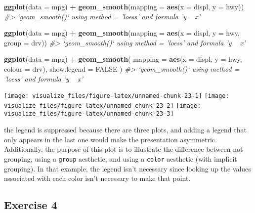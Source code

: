 \documentclass[]{book}
\newenvironment{Shaded}{\begin{snugshade}}{\end{snugshade}}
\newcommand{\CommentTok}[1]{\textcolor[rgb]{0.56,0.35,0.01}{\textit{#1}}}
\newcommand{\DataTypeTok}[1]{\textcolor[rgb]{0.13,0.29,0.53}{#1}}
\newcommand{\KeywordTok}[1]{\textcolor[rgb]{0.13,0.29,0.53}{\textbf{#1}}}
\newcommand{\NormalTok}[1]{#1}
\newcommand{\OperatorTok}[1]{\textcolor[rgb]{0.81,0.36,0.00}{\textbf{#1}}}
\newcommand{\OtherTok}[1]{\textcolor[rgb]{0.56,0.35,0.01}{#1}}
\newcommand{\StringTok}[1]{\textcolor[rgb]{0.31,0.60,0.02}{#1}}
\theoremstyle{plain}
\theoremstyle{remark}
\theoremstyle{definition}
\theoremstyle{definition}
\theoremstyle{definition}
\theoremstyle{remark}
\begin{document}
\begin{Shaded}
\begin{Highlighting}[]
\KeywordTok{ggplot}\NormalTok{(}\DataTypeTok{data =}\NormalTok{ mpg) }\OperatorTok{+}
\StringTok{  }\KeywordTok{geom_smooth}\NormalTok{(}\DataTypeTok{mapping =} \KeywordTok{aes}\NormalTok{(}\DataTypeTok{x =}\NormalTok{ displ, }\DataTypeTok{y =}\NormalTok{ hwy))}
\CommentTok{#> `geom_smooth()` using method = 'loess' and formula 'y ~ x'}

\KeywordTok{ggplot}\NormalTok{(}\DataTypeTok{data =}\NormalTok{ mpg) }\OperatorTok{+}
\StringTok{  }\KeywordTok{geom_smooth}\NormalTok{(}\DataTypeTok{mapping =} \KeywordTok{aes}\NormalTok{(}\DataTypeTok{x =}\NormalTok{ displ, }\DataTypeTok{y =}\NormalTok{ hwy, }\DataTypeTok{group =}\NormalTok{ drv))}
\CommentTok{#> `geom_smooth()` using method = 'loess' and formula 'y ~ x'}

\KeywordTok{ggplot}\NormalTok{(}\DataTypeTok{data =}\NormalTok{ mpg) }\OperatorTok{+}
\StringTok{  }\KeywordTok{geom_smooth}\NormalTok{(}
    \DataTypeTok{mapping =} \KeywordTok{aes}\NormalTok{(}\DataTypeTok{x =}\NormalTok{ displ, }\DataTypeTok{y =}\NormalTok{ hwy, }\DataTypeTok{colour =}\NormalTok{ drv),}
    \DataTypeTok{show.legend =} \OtherTok{FALSE}
\NormalTok{  )}
\CommentTok{#> `geom_smooth()` using method = 'loess' and formula 'y ~ x'}
\end{Highlighting}
\end{Shaded}

\begin{center}\texttt{[image: visualize\_files/figure-latex/unnamed-chunk-23-1]} \texttt{[image: visualize\_files/figure-latex/unnamed-chunk-23-2]} \texttt{[image: visualize\_files/figure-latex/unnamed-chunk-23-3]} \end{center}

the legend is suppressed because there are three plots, and adding a
legend that only appears in the last one would make the presentation
asymmetric. Additionally, the purpose of this plot is to illustrate the
difference between not grouping, using a \texttt{group} aesthetic, and
using a \texttt{color} aesthetic (with implicit grouping). In that
example, the legend isn't necessary since looking up the values
associated with each color isn't necessary to make that point.

\hypertarget{exercise-4-1}{%
\subsection{Exercise 4}\label{exercise-4-1}}
\end{document}
